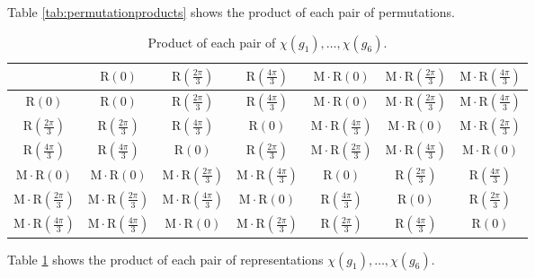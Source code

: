 \documentclass[12pt]{extarticle}
\begin{document}
Table \ref{tab:permutationproducts} shows the product of each pair of permutations.
\begin{table}[h!]
    \centering
\begin{footnotesize}
    \begin{tabular}{c|c|c|c|c|c|c}
        & $\text{R}(0)$ & $\text{R}(\frac{2\pi}{3})$ & $\text{R}(\frac{4\pi}{3})$ & $\text{M}\cdot\text{R}(0)$ & $\text{M}\cdot\text{R}(\frac{2\pi}{3})$ & $\text{M}\cdot\text{R}(\frac{4\pi}{3})$ \\
        \hline
        $\text{R}(0)$                           & $\text{R}(0)$ & $\text{R}(\frac{2\pi}{3})$ & $\text{R}(\frac{4\pi}{3})$ & $\text{M}\cdot\text{R}(0)$ & $\text{M}\cdot\text{R}(\frac{2\pi}{3})$ & $\text{M}\cdot\text{R}(\frac{4\pi}{3})$ \\
        $\text{R}(\frac{2\pi}{3})$              & $\text{R}(\frac{2\pi}{3})$ & $\text{R}(\frac{4\pi}{3})$ & $\text{R}(0)$ & $\text{M}\cdot\text{R}(\frac{4\pi}{3})$ & $\text{M}\cdot\text{R}(0)$ & $\text{M}\cdot\text{R}(\frac{2\pi}{3})$ \\
        $\text{R}(\frac{4\pi}{3})$              & $\text{R}(\frac{4\pi}{3})$ & $\text{R}(0)$ & $\text{R}(\frac{2\pi}{3})$ & $\text{M}\cdot\text{R}(\frac{2\pi}{3})$ & $\text{M}\cdot\text{R}(\frac{4\pi}{3})$ & $\text{M}\cdot\text{R}(0)$ \\
        $\text{M}\cdot\text{R}(0)$              & $\text{M}\cdot\text{R}(0)$              & $\text{M}\cdot\text{R}(\frac{2\pi}{3})$              & $\text{M}\cdot\text{R}(\frac{4\pi}{3})$              & $\text{R}(0)$ & $\text{R}(\frac{2\pi}{3})$ & $\text{R}(\frac{4\pi}{3})$ \\
        $\text{M}\cdot\text{R}(\frac{2\pi}{3})$ & $\text{M}\cdot\text{R}(\frac{2\pi}{3})$ & $\text{M}\cdot\text{R}(\frac{4\pi}{3})$ & $\text{M}\cdot\text{R}(0)$ & $\text{R}(\frac{4\pi}{3})$ & $\text{R}(0)$ & $\text{R}(\frac{2\pi}{3})$ \\
        $\text{M}\cdot\text{R}(\frac{4\pi}{3})$ & $\text{M}\cdot\text{R}(\frac{4\pi}{3})$ & $\text{M}\cdot\text{R}(0)$ & $\text{M}\cdot\text{R}(\frac{2\pi}{3})$ & $\text{R}(\frac{2\pi}{3})$ & $\text{R}(\frac{4\pi}{3})$ & $\text{R}(0)$ \\
    \end{tabular}
\end{footnotesize}
\caption{Product of each pair of $\chi(g_1), \ldots, \chi(g_6)$.}
\label{tab:representationproducts}
\end{table}
Table \ref{tab:representationproducts} shows the product of each pair of representations $\chi(g_1), \ldots, \chi(g_6)$.
\end{document}
